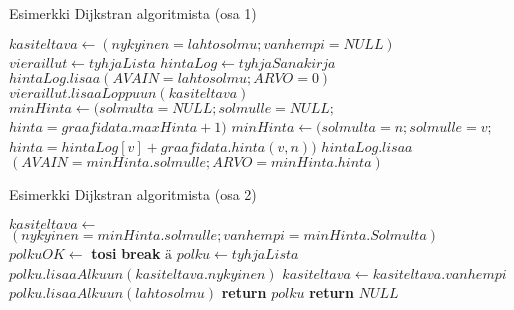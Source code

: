 \begin{algorithm}
\caption{Esimerkki Dijkstran algoritmista (osa 1)}\label{DijkstrEsim}
\begin{algorithmic}
	\State $kasiteltava \gets (nykyinen=lahtosolmu;vanhempi=NULL)$
	\State $vieraillut \gets tyhjaLista$
	\State $hintaLog \gets tyhjaSanakirja$
	\State $hintaLog.lisaa(AVAIN=lahtosolmu;ARVO=0)$
		\State $vieraillut.lisaaLoppuun(kasiteltava)$
		\State $minHinta \gets (solmulta=NULL;solmulle=NULL;$
		\State $hinta=graafidata.maxHinta+1)$
					\State $minHinta \gets (solmulta=n;solmulle=v;$
					\State $hinta=hintaLog[v]+graafidata.hinta(v,n))$
				\EndIf
			\EndFor
		\EndFor
		\State $hintaLog.lisaa$
		\State $(AVAIN=minHinta.solmulle;ARVO=minHinta.hinta)$

\end{algorithmic}
\end{algorithm}
\begin{algorithm}
\caption{Esimerkki Dijkstran algoritmista (osa 2)}
\begin{algorithmic}

		\State $kasiteltava \gets$
		\State $(nykyinen=minHinta.solmulle;vanhempi=minHinta.Solmulta)$
			\State $polkuOK \gets$ \textbf{ tosi}
			\State \textbf{break} $ä$
		\EndIf
	\EndWhile
		\State $polku \gets tyhjaLista$
			\State $polku.lisaaAlkuun(kasiteltava.nykyinen)$
			\State $kasiteltava \gets kasiteltava.vanhempi$
		\EndWhile
		\State $polku.lisaaAlkuun(lahtosolmu)$
		\State \textbf{return} $polku$
	\Else
		\State \textbf{return} $NULL$
	\EndIf
\EndProcedure
\end{algorithmic}
\end{algorithm}

